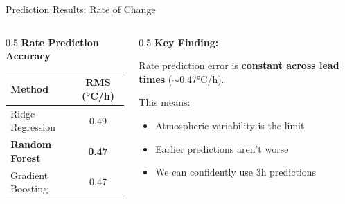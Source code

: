 \documentclass[aspectratio=169,11pt]{beamer}
\begin{document}
\begin{frame}{Prediction Results: Rate of Change}

\begin{columns}
\begin{column}{0.5\textwidth}
\centering
\textbf{Rate Prediction Accuracy}

\vspace{0.5em}

\begin{tabular}{l|c}
\toprule
\textbf{Method} & \textbf{RMS (°C/h)} \\
\midrule
Ridge Regression & 0.49 \\
\textbf{Random Forest} & \textbf{0.47} \\
Gradient Boosting & 0.47 \\
\bottomrule
\end{tabular}
\end{column}

\begin{column}{0.5\textwidth}
\textbf{Key Finding:}

\vspace{0.5em}

Rate prediction error is \textbf{constant across lead times} ($\sim$0.47°C/h).

\vspace{1em}

This means:
\begin{itemize}
    \item Atmospheric variability is the limit
    \item Earlier predictions aren't worse
    \item We can confidently use 3h predictions
\end{itemize}
\end{column}
\end{columns}

\end{frame}
\end{document}
